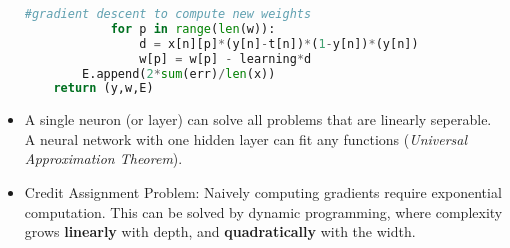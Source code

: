 \documentclass[a4paper]{article}
\numberwithin{equation}{section}
\begin{document}
\begin{itemize}
\begin{lstlisting}[language=Python]
            #gradient descent to compute new weights
            for p in range(len(w)):
                d = x[n][p]*(y[n]-t[n])*(1-y[n])*(y[n])
                w[p] = w[p] - learning*d
        E.append(2*sum(err)/len(x))
    return (y,w,E)
    \end{lstlisting}
    \item A single neuron (or layer) can solve all problems that are linearly seperable. A neural network with one hidden layer can fit any functions (\textit{Universal Approximation Theorem}).
    \item Credit Assignment Problem: Naively computing gradients require exponential computation. This can be solved by dynamic programming, where complexity grows \textbf{linearly} with depth, and \textbf{quadratically} with the width.    
\end{itemize}
\end{document}
